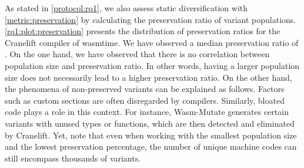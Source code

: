 \documentclass[a4paper,fleqn]{cas-dc}
\newcommand*\badge[1]{ \colorbox{red}{\color{white}#1}}
\newcommand{\tool}{{\sc Wasm-Mutate}\xspace}
\newcommand{\Wasm}{WebAssembly\xspace}
\newcommand{\wasm}{\Wasm}
\newcommand{\todo}[1]{%
\refstepcounter{todo}
\noindent\textbf{\badge{TODO}} {\color{red}#1}
\addcontentsline{td}{todo}
{\color{red}\thesection.\thetodo\xspace #1}}
\begin{document}
As stated in \autoref{protocol:rq1}, we also assess static diversification with \autoref{metric:preservation} by calculating the preservation ratio of variant populations. 
\autoref{rq1:plot:preservation} presents the distribution of preservation ratios for the Cranelift compiler of wasmtime. 
We have observed a median preservation ratio of \preserved. 
On the one hand, we have observed that there is no correlation between population size and preservation ratio. 
In other words, having a larger population size does not necessarily lead to a higher preservation ratio.
On the other hand, the phenomena of non-preserved variants can be explained as follows. 
Factors such as custom sections are often disregarded by compilers. 
Similarly, bloated code plays a role in this context. 
For instance, \tool generates certain variants with unused types or functions, which are then detected and eliminated by Cranelift.
Yet, note that even when working with the smallest population size and the lowest preservation percentage, the number of unique machine codes can still encompass thousands of variants.





\end{document}
